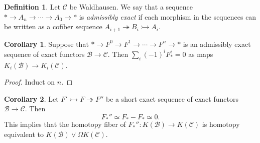 \documentclass[10pt,letterpaper,cm]{nupset}
\theoremstyle{definition}
\newtheorem*{definition}{Definition}
\newtheorem{corollary}{Corollary}
\newcommand{\1}{\mathbf{1}}
\renewcommand{\b}{\mathscr{B}}
\renewcommand{\c}{\mathscr{C}}
\newcommand{\0}{\vec 0}
\begin{document}
\begin{definition}
Let $\c$ be Waldhausen. We say that a sequence $\ast \to A_n \to \cdots \to A_0 \to \ast$ is \textit{admissibly exact} if each morphism in the sequences can be written as a cofiber sequence $A_{i+1} \twoheadrightarrow B_i \rightarrowtail A_i$. 
\end{definition}

\begin{corollary}
Suppose that $\ast \to F^0 \to F^1 \to \cdots \to F^n \to \ast$ is an admissibly exact sequence of exact functors $\b \to \c$. Then $\sum_i (-1)^iF_{\ast}^i = 0$ as maps $K_i(\b) \to K_i(\c)$.
\end{corollary}
\begin{proof}
Induct on $n$.
\end{proof}

\begin{corollary}
Let $F' \rightarrowtail F \twoheadrightarrow F''$ be a short exact sequence of exact functors $\b \to \c$. Then $$F_{\ast}'' \simeq F_{\ast} - F_{\ast} \simeq 0.$$ This implies that the homotopy fiber of $F_{\ast}'' : K(\b) \to K(\c)$ is homotopy equivalent to $K(\b) \vee \Omega K(\c)$.
\end{corollary}
\end{document}
